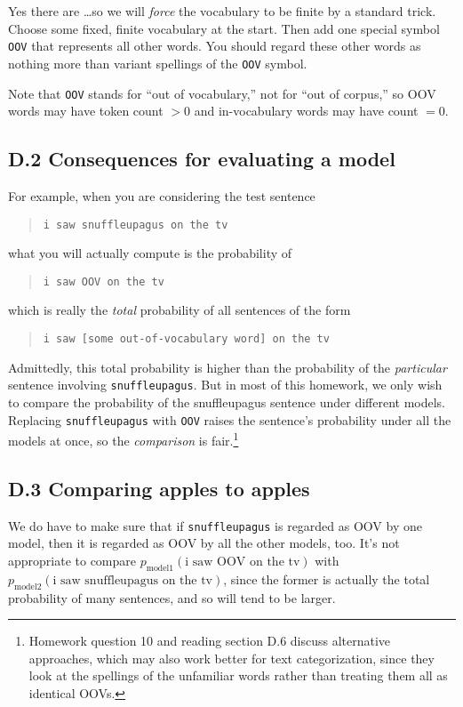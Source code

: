 Yes there are \ldots so we will \textit{force} the vocabulary to be finite by a standard trick. Choose some fixed, finite vocabulary at the start. Then add one special symbol \texttt{OOV} that represents all other words. You should regard these other words as nothing more than variant spellings of the \texttt{OOV} symbol.

Note that \texttt{OOV} stands for “out of vocabulary,” not for “out of corpus,” so OOV words may have token count $> 0$ and in-vocabulary words may have count $= 0$.

\subsection*{D.2 Consequences for evaluating a model}
For example, when you are considering the test sentence
\begin{quote}
\texttt{i saw snuffleupagus on the tv}
\end{quote}
what you will actually compute is the probability of
\begin{quote}
\texttt{i saw OOV on the tv}
\end{quote}
which is really the \textit{total} probability of all sentences of the form
\begin{quote}
\texttt{i saw [some out-of-vocabulary word] on the tv}
\end{quote}

Admittedly, this total probability is higher than the probability of the \textit{particular} sentence involving \texttt{snuffleupagus}. But in most of this homework, we only wish to compare the probability of the snuffleupagus sentence under different models. Replacing \texttt{snuffleupagus} with \texttt{OOV} raises the sentence’s probability under all the models at once, so the \textit{comparison} is fair.\footnote{Homework question 10 and reading section D.6 discuss alternative approaches, which may also work better for text categorization, since they look at the spellings of the unfamiliar words rather than treating them all as identical OOVs.}

\subsection*{D.3 Comparing apples to apples}

We do have to make sure that if \texttt{snuffleupagus} is regarded as OOV by one model, then it is regarded as OOV by all the other models, too. It’s not appropriate to compare $p_{\text{model1}}(\text{i saw OOV on the tv})$ with $p_{\text{model2}}(\text{i saw snuffleupagus on the tv})$, since the former is actually the total probability of many sentences, and so will tend to be larger.

